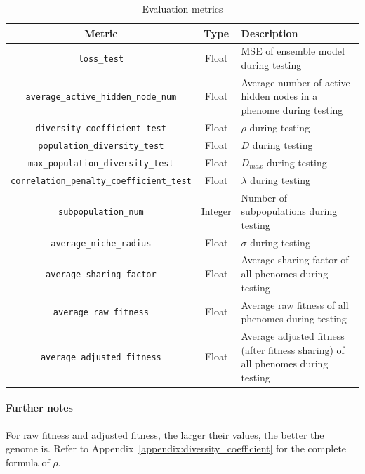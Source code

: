 \documentclass{article}
\begin{document}
\begin{table}[H]
    \centering
    \begin{tabular}{|c|c|p{5cm}|}
        \hline
        Metric & Type & Description \\
        \hline
        \small\texttt{loss\_test} & Float & MSE of ensemble model during testing \\
        \hline
        \small\texttt{average\_active\_hidden\_node\_num} & Float & Average number of active hidden nodes in a phenome during testing \\
        \hline
        \small\texttt{diversity\_coefficient\_test} & Float & $\rho$ during testing \\
        \hline
        \small\texttt{population\_diversity\_test} & Float & $D$ during testing \\
        \hline
        \small\texttt{max\_population\_diversity\_test} & Float & $D_{max}$ during testing \\
        \hline
        \small\texttt{correlation\_penalty\_coefficient\_test} & Float & $\lambda$ during testing \\
        \hline
        \small\texttt{subpopulation\_num} & Integer & Number of subpopulations during testing \\
        \hline
        \small\texttt{average\_niche\_radius} & Float & $\sigma$ during testing \\
        \hline
        \small\texttt{average\_sharing\_factor} & Float & Average sharing factor of all phenomes during testing \\
        \hline
        \small\texttt{average\_raw\_fitness} & Float & Average raw fitness of all phenomes during testing \\
        \hline
        \small\texttt{average\_adjusted\_fitness} & Float & Average adjusted fitness (after fitness sharing) of all phenomes during testing \\
        \hline
    \end{tabular}
    \caption{Evaluation metrics}
    \label{table:experiment_4_metric}
\end{table}

\paragraph{Further notes}
For raw fitness and adjusted fitness, the larger their values, the better the genome is. 
Refer to Appendix~\ref{appendix:diversity_coefficient} for the complete formula of $\rho$. 
\end{document}
